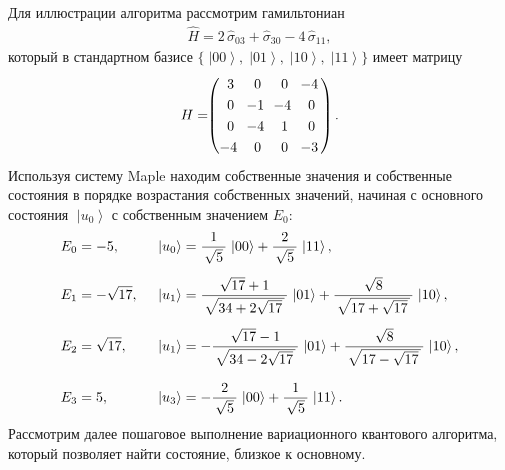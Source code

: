 \documentclass[a4paper]{report}
\newcommand{\ket}[1] {\!\!\;\ensuremath{\left|#1\right\rangle}}
\begin{document}
Для иллюстрации алгоритма рассмотрим гамильтониан
\begin{align}\label{H}
\hat{H} = 2\,\hat{\sigma}_{03} + \hat{\sigma}_{30} - 4\,\hat{\sigma}_{11},
\end{align}
который в стандартном базисе $\big\{\ket{00}, \ket{01}, \ket{10}, \ket{11}\!\big\}$ имеет матрицу
\begin{equation}\label{}
H=
\!\!\left(\!
\begin{array}{cccc}
3& 0& 0& \!\!-4 \vphantom{\hat{A}}  \\[2pt]
0& \!\!-1& \!\!-4& 0 \vphantom{\hat{A}}  \\[2pt]
0& \!\!-4& 1& 0 \vphantom{\hat{A}}  \\[2pt]
\!\!-4& 0& 0& \!\!-3 \vphantom{\hat{A}}
\end{array}
\!\!\right).\nonumber
\end{equation}
Используя систему Maple находим собственные значения и собственные состояния в порядке возрастания собственных значений, начиная с основного состояния $\ket{u_0}$ с собственным значением $E_0$:
\begin{align}
E_0&= -5,\; &&\ket{u_0}= \frac{1}{\,\sqrt{5}\,}\,\ket{00}+ \frac{2}{\,\sqrt{5}\,}\,\ket{11}, \label{E0-u0}\\
E_1&= -\sqrt{17},\;\vphantom{\int\limits^A} &&\ket{u_1}= \frac{\sqrt{17}+1}{\,\sqrt{34+2\sqrt{17}\,}\,}\,\ket{01}+ \frac{\sqrt{8}}{\,\sqrt{17+\sqrt{17}\,}\,}\,\ket{10}, \label{E1-u1}\\
E_2&= \sqrt{17},\;\vphantom{\int\limits^A} &&\ket{u_1}= -\frac{\sqrt{17}-1}{\,\sqrt{34-2\sqrt{17}\,}\,}\,\ket{01}+ \frac{\sqrt{8}}{\,\sqrt{17-\sqrt{17}\,}\,}\,\ket{10}, \label{E2-u2}\\
E_3&= 5,\;\vphantom{\int\limits^A} &&\ket{u_3}= -\frac{2}{\,\sqrt{5}\,}\,\ket{00}+ \frac{1}{\,\sqrt{5}\,}\,\ket{11}. \label{E3-u3}
\end{align}
Рассмотрим далее пошаговое выполнение вариационного квантового алгоритма, который позволяет найти состояние, близкое к основному.
\end{document}
